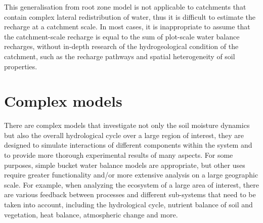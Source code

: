 \newline
This generalisation from root zone model is not applicable to catchments that contain complex lateral redistribution of water, thus it is difficult to estimate the recharge at a catchment scale. In most cases, it is inappropriate to assume that the catchment-scale recharge is equal to the sum of plot-scale water balance recharges, without in-depth research of the hydrogeological condition of the catchment, such as the recharge pathways and spatial heterogeneity of soil properties\citep{Zhang2002}.
 
\section{Complex models}
There are complex models that investigate not only the soil moisture dynamics but also the overall hydrological cycle over a large region of interest, they are designed to simulate interactions of different components within the system and to provide more thorough experimental results of many aspects\citep{Zhang2001}. For some purposes, simple bucket water balance models are appropriate, but other uses require greater functionality and/or more extensive analysis on a large geographic scale. For example, when analyzing the ecosystem of a large area of interest, there are various feedback between processes and different sub-systems that need to be taken into account, including the hydrological cycle, nutrient balance of soil and vegetation, heat balance, atmospheric change and more.
